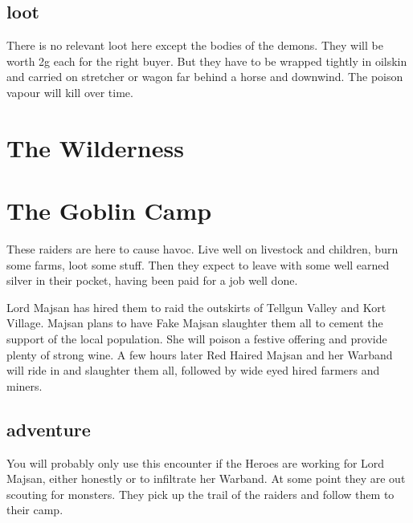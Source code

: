 \subsection*{loot}
There is no relevant loot here except the bodies of the demons. They will be worth 2g each for the right buyer. But they have to be wrapped tightly in oilskin and carried on stretcher or wagon far behind a horse and downwind. The poison vapour will kill over time.







\section*{The Wilderness}



\section*{The Goblin Camp}
These raiders are here to cause havoc. Live well on livestock and children, burn some farms, loot some stuff. Then they expect to leave with some well earned silver in their pocket, having been paid for a job well done.

Lord Majsan has hired them to raid the outskirts of Tellgun Valley and Kort Village. Majsan plans to have Fake Majsan slaughter them all to cement the support of the local population. She will poison a festive offering and provide plenty of strong wine. A few hours later Red Haired Majsan and her Warband will ride in and slaughter them all, followed by wide eyed hired farmers and miners.


\subsection*{adventure}
You will probably only use this encounter if the Heroes are working for Lord Majsan, either honestly or to infiltrate her Warband. At some point they are out scouting for monsters. They pick up the trail of the raiders and follow them to their camp.


